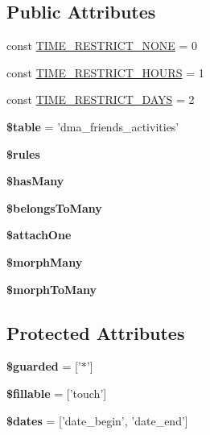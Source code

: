 \subsection*{Public Attributes}
\begin{DoxyCompactItemize}
\item 
const \hyperlink{classDMA_1_1Friends_1_1Models_1_1Activity_ab9dd8b18c4810beabdcf8e45039913c8}{T\-I\-M\-E\-\_\-\-R\-E\-S\-T\-R\-I\-C\-T\-\_\-\-N\-O\-N\-E} = 0
\item 
const \hyperlink{classDMA_1_1Friends_1_1Models_1_1Activity_ac78040e8784e02c2d1bcce5221ac6cb8}{T\-I\-M\-E\-\_\-\-R\-E\-S\-T\-R\-I\-C\-T\-\_\-\-H\-O\-U\-R\-S} = 1
\item 
const \hyperlink{classDMA_1_1Friends_1_1Models_1_1Activity_a71b85478f20cda144aeffe010364a0f7}{T\-I\-M\-E\-\_\-\-R\-E\-S\-T\-R\-I\-C\-T\-\_\-\-D\-A\-Y\-S} = 2
\item 
\hypertarget{classDMA_1_1Friends_1_1Models_1_1Activity_a2ded517047c73d831aef535c8adc6690}{{\bfseries \$table} = 'dma\-\_\-friends\-\_\-activities'}\label{classDMA_1_1Friends_1_1Models_1_1Activity_a2ded517047c73d831aef535c8adc6690}

\item 
{\bfseries \$rules}
\item 
{\bfseries \$has\-Many}
\item 
{\bfseries \$belongs\-To\-Many}
\item 
{\bfseries \$attach\-One}
\item 
{\bfseries \$morph\-Many}
\item 
{\bfseries \$morph\-To\-Many}
\end{DoxyCompactItemize}
\subsection*{Protected Attributes}
\begin{DoxyCompactItemize}
\item 
\hypertarget{classDMA_1_1Friends_1_1Models_1_1Activity_ac82a10f722788b5c1c7a5295e1ac10c2}{{\bfseries \$guarded} = \mbox{[}'$\ast$'\mbox{]}}\label{classDMA_1_1Friends_1_1Models_1_1Activity_ac82a10f722788b5c1c7a5295e1ac10c2}

\item 
\hypertarget{classDMA_1_1Friends_1_1Models_1_1Activity_ab2a7401215dff9dfd8b600247b12454a}{{\bfseries \$fillable} = \mbox{[}'touch'\mbox{]}}\label{classDMA_1_1Friends_1_1Models_1_1Activity_ab2a7401215dff9dfd8b600247b12454a}

\item 
\hypertarget{classDMA_1_1Friends_1_1Models_1_1Activity_afe94503fbf177345e4bf0b1625dee499}{{\bfseries \$dates} = \mbox{[}'date\-\_\-begin', 'date\-\_\-end'\mbox{]}}\label{classDMA_1_1Friends_1_1Models_1_1Activity_afe94503fbf177345e4bf0b1625dee499}

\end{DoxyCompactItemize}


